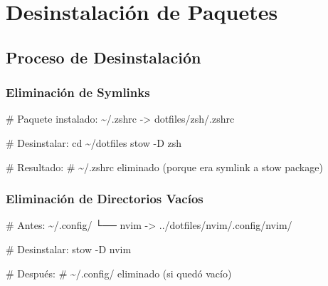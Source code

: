 \documentclass[
  doc,
  floatsintext,
  longtable,
  a4paper,
  nolmodern,
  notxfonts,
  notimes,
  12pt,
  colorlinks=true,linkcolor=blue,citecolor=blue,urlcolor=blue]{apa7}
\newenvironment{Shaded}{\begin{snugshade}}{\end{snugshade}}
\newcommand{\AttributeTok}[1]{\textcolor[rgb]{0.40,0.45,0.13}{#1}}
\newcommand{\BuiltInTok}[1]{\textcolor[rgb]{0.00,0.23,0.31}{#1}}
\newcommand{\CommentTok}[1]{\textcolor[rgb]{0.37,0.37,0.37}{#1}}
\newcommand{\ExtensionTok}[1]{\textcolor[rgb]{0.00,0.23,0.31}{#1}}
\newcommand{\NormalTok}[1]{\textcolor[rgb]{0.00,0.23,0.31}{#1}}
\newcommand{\OperatorTok}[1]{\textcolor[rgb]{0.37,0.37,0.37}{#1}}
\begin{document}
\section{Desinstalación de
Paquetes}\label{desinstalaciuxf3n-de-paquetes}

\subsection{Proceso de
Desinstalación}\label{proceso-de-desinstalaciuxf3n}

\subsubsection{Eliminación de
Symlinks}\label{eliminaciuxf3n-de-symlinks}

\begin{Shaded}
\begin{Highlighting}[]
\CommentTok{\# Paquete instalado:}
\ExtensionTok{\textasciitilde{}/.zshrc} \AttributeTok{{-}}\OperatorTok{\textgreater{}}\NormalTok{ dotfiles/zsh/.zshrc}

\CommentTok{\# Desinstalar:}
\BuiltInTok{cd}\NormalTok{ \textasciitilde{}/dotfiles}
\ExtensionTok{stow} \AttributeTok{{-}D}\NormalTok{ zsh}

\CommentTok{\# Resultado:}
\CommentTok{\# \textasciitilde{}/.zshrc eliminado (porque era symlink a stow package)}
\end{Highlighting}
\end{Shaded}

\subsubsection{Eliminación de Directorios
Vacíos}\label{eliminaciuxf3n-de-directorios-vacuxedos}

\begin{Shaded}
\begin{Highlighting}[]
\CommentTok{\# Antes:}
\ExtensionTok{\textasciitilde{}/.config/}
  \ExtensionTok{└──}\NormalTok{ nvim }\AttributeTok{{-}}\OperatorTok{\textgreater{}}\NormalTok{ ../dotfiles/nvim/.config/nvim/}

\CommentTok{\# Desinstalar:}
\ExtensionTok{stow} \AttributeTok{{-}D}\NormalTok{ nvim}

\CommentTok{\# Después:}
\CommentTok{\# \textasciitilde{}/.config/ eliminado (si quedó vacío)}
\end{Highlighting}
\end{Shaded}
\end{document}
